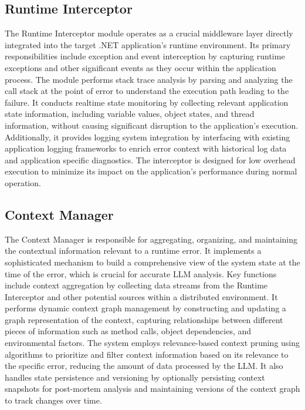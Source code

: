 \subsection{Runtime Interceptor}
The Runtime Interceptor module operates as a crucial middle\-ware layer directly integrated into the target .NET application's run\-time environ\-ment. Its primary responsi\-bilities include exception and event inter\-cep\-tion by cap\-turing run\-time ex\-cep\-tions and other sig\-nif\-i\-cant events as they oc\-cur within the ap\-pli\-ca\-tion pro\-cess. The mod\-ule per\-forms stack trace anal\-y\-sis by pars\-ing and ana\-lyz\-ing the call stack at the point of er\-ror to un\-der\-stand the ex\-e\-cu\-tion path lead\-ing to the fail\-ure. It con\-ducts real\-time state mon\-i\-tor\-ing by col\-lect\-ing rel\-e\-vant ap\-pli\-ca\-tion state in\-for\-ma\-tion, in\-clud\-ing var\-i\-a\-ble val\-ues, ob\-ject states, and thread in\-for\-ma\-tion, with\-out caus\-ing sig\-nif\-i\-cant dis\-rup\-tion to the ap\-pli\-ca\-tion's ex\-e\-cu\-tion. Ad\-di\-tion\-ally, it pro\-vides log\-ging sys\-tem in\-te\-gra\-tion by in\-ter\-fac\-ing with ex\-ist\-ing ap\-pli\-ca\-tion log\-ging frame\-works to en\-rich er\-ror con\-text with his\-tor\-i\-cal log data and ap\-pli\-ca\-tion spe\-cific di\-ag\-nos\-tics. The in\-ter\-cep\-tor is de\-signed for low over\-head ex\-e\-cu\-tion to min\-i\-mize its im\-pact on the ap\-pli\-ca\-tion's per\-for\-mance dur\-ing nor\-mal op\-er\-a\-tion.

\subsection{Context Manager}
The Context Manager is responsible for aggregating, organizing, and maintaining the contextual information relevant to a runtime error. It implements a sophisticated mechanism to build a comprehensive view of the system state at the time of the error, which is crucial for accurate LLM analysis. Key functions include context aggregation by collecting data streams from the Runtime Interceptor and other potential sources within a distributed environment. It performs dynamic context graph management by constructing and updating a graph representation of the context, capturing relationships between different pieces of information such as method calls, object dependencies, and environmental factors. The system employs relevance-based context pruning using algorithms to prioritize and filter context information based on its relevance to the specific error, reducing the amount of data processed by the LLM. It also handles state persistence and versioning by optionally persisting context snapshots for post-mortem analysis and maintaining versions of the context graph to track changes over time.

